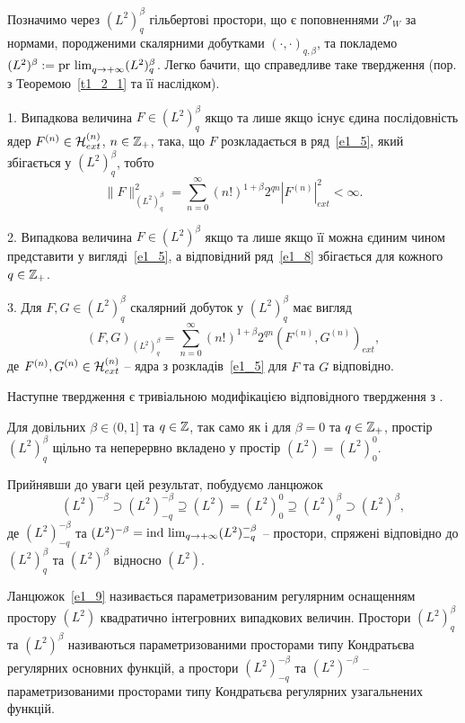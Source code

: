Позначимо через $(L^2)^\beta_q$ гільбертові простори, що є поповненнями $\mathcal P_W$ за
нормами, породженими скалярними добутками $(\cdot,\cdot)_{q,\beta}$, та покладемо
$(L^2)^\beta:=\mathop{\rm{pr\ lim}}_{q\to+\infty}(L^2)^\beta_q$. Легко бачити,
що справедливе таке твердження (пор. з Теоремою~\ref{t1_2_1} та її наслідком).
\begin{subproposition}\label{p1_3_1}
1. Випадкова величина $F\in (L^2)^\beta_q$ якщо та лише якщо існує єдина послідовність ядер
$F^{(n)}\in\mathcal{H}_{ext}^{(n)}$, $n\in\mathbb{Z}_+$, така, що $F$ розкладається
в ряд~\eqref{e1_5}, який збігається у $(L^2)^\beta_q$, тобто
\begin{equation}\label{e1_8}
\|F\|_{(L^2)^\beta_q}^2
=\sum_{n=0}^\infty (n!)^{1+\beta}2^{qn}|F^{(n)}|_{ext}^2<\infty.
\end{equation}

2. Випадкова величина $F\in (L^2)^\beta$ якщо та лише якщо її можна єдиним чином представити
у вигляді~\eqref{e1_5}, а відповідний ряд~\eqref{e1_8} збігається для кожного $q\in\mathbb{Z}_+$.

3. Для $F,G\in (L^2)^\beta_q$ скалярний добуток у $(L^2)^\beta_q$ має вигляд
\begin{equation*}
(F,G)_{(L^2)^\beta_q}
=\sum_{n=0}^\infty (n!)^{1+\beta}2^{qn}
(F^{(n)},G^{(n)})_{ext},
\end{equation*}
де $F^{(n)},G^{(n)}\in\mathcal{H}_{ext}^{(n)}$ -- ядра з розкладів~\eqref{e1_5} для
$F$ та $G$ відповідно.
\end{subproposition}
Наступне твердження є тривіальною модифікацією відповідного твердження з
\cite{K13_2}.
\begin{subproposition}
Для довільних $\beta\in (0,1]$ та $q\in\mathbb{Z}$, так само як і для $\beta=0$ та
$q\in\mathbb{Z}_+$, простір $(L^2)^\beta_q$ щільно та неперервно вкладено у простір
$(L^2)=(L^2)^0_0$.
\end{subproposition}

Прийнявши до уваги цей результат, побудуємо ланцюжок
\begin{equation}\label{e1_9}
(L^2)^{-\beta}\supset (L^2)^{-\beta}_{-q}\supseteq (L^2)=(L^2)^0_0
\supseteq (L^2)^\beta_q\supset (L^2)^\beta,
\end{equation}
де $(L^2)^{-\beta}_{-q}$ та $(L^2)^{-\beta}
=\mathop{\rm{ind\ lim}}_{q\to+\infty}(L^2)^{-\beta}_{-q}$ -- простори, спряжені
відповідно до $(L^2)^\beta_q$ та $(L^2)^\beta$ відносно $(L^2)$.
\begin{subdefinition}
Ланцюжок~\eqref{e1_9} називається параметризованим регулярним оснащенням простору
$(L^2)$ квадратично інтегровних випадкових величин. Простори $(L^2)^\beta_q$ та
$(L^2)^\beta$ називаються параметризованими просторами типу Кондратьєва регулярних
основних функцій, а простори $(L^2)^{-\beta}_{-q}$ та $(L^2)^{-\beta}$ --
параметризованими просторами типу Кондратьєва регулярних узагальнених функцій.
\end{subdefinition}

